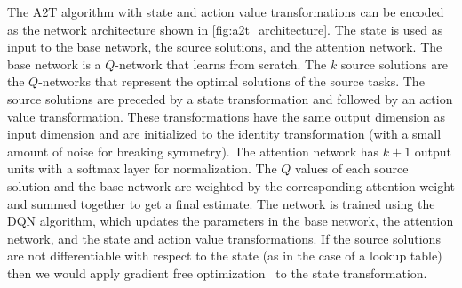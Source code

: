 The A2T algorithm with state and action value transformations can be encoded as the network architecture shown in \cref{fig:a2t_architecture}. The state is used as input to the base network, the source solutions, and the attention network. The base network is a $Q$-network that learns from scratch. The $k$ source solutions are the $Q$-networks that represent the optimal solutions of the source tasks. The source solutions are preceded by a state transformation and followed by an action value transformation. These transformations have the same output dimension as input dimension and are initialized to the identity transformation (with a small amount of noise for breaking symmetry). The attention network has $k+1$ output units with a softmax layer for normalization. The $Q$ values of each source solution and the base network are weighted by the corresponding attention weight and summed together to get a final estimate. The network is trained using the DQN algorithm, which updates the parameters in the base network, the attention network, and the state and action value transformations. If the source solutions are not differentiable with respect to the state (as in the case of a lookup table) then we would apply gradient free optimization~\cite{kochenderfer2019algorithms} to the state transformation.

